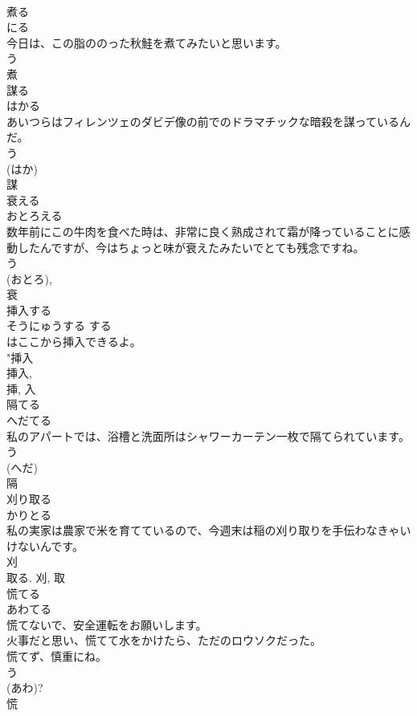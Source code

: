 \documentclass[8pt]{extreport}
\begin{document}
\begin{CJK}{UTF8}{min}
\\	煮る	
\\	にる	
\\	今日は、この脂ののった秋鮭を煮てみたいと思います。	
\\	う 
\\	煮	
\\	謀る	
\\	はかる	
\\	あいつらはフィレンツェのダビデ像の前でのドラマチックな暗殺を謀っているんだ。	
\\	う 
\\	(はか) 
\\	謀	
\\	衰える	
\\	おとろえる	
\\	数年前にこの牛肉を食べた時は、非常に良く熟成されて霜が降っていることに感動したんですが、今はちょっと味が衰えたみたいでとても残念ですね。	
\\	う 
\\	(おとろ), 
\\	衰	
\\	挿入する	
\\	そうにゅうする	する 
\\	はここから挿入できるよ。	
\\	"挿入 
\\	挿入, 
\\	挿, 入	
\\	隔てる	
\\	へだてる	
\\	私のアパートでは、浴槽と洗面所はシャワーカーテン一枚で隔てられています。	
\\	う 
\\	(へだ) 
\\	隔	
\\	刈り取る	
\\	かりとる	
\\	私の実家は農家で米を育てているので、今週末は稲の刈り取りを手伝わなきゃいけないんです。	
\\	刈 
\\	取る.	刈, 取	
\\	慌てる	
\\	あわてる	
\\	慌てないで、安全運転をお願いします。	
\\	火事だと思い、慌てて水をかけたら、ただのロウソクだった。	
\\	慌てず、慎重にね。	
\\	う 
\\	(あわ)?
\\	慌	

\end{CJK}
\end{document}
